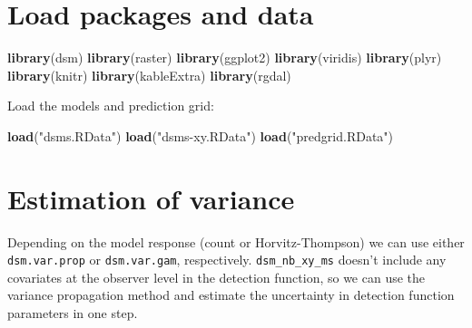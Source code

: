 \documentclass[]{book}
\newenvironment{Shaded}{\begin{snugshade}}{\end{snugshade}}
\newcommand{\KeywordTok}[1]{\textcolor[rgb]{0.13,0.29,0.53}{\textbf{#1}}}
\newcommand{\DataTypeTok}[1]{\textcolor[rgb]{0.13,0.29,0.53}{#1}}
\newcommand{\StringTok}[1]{\textcolor[rgb]{0.31,0.60,0.02}{#1}}
\newcommand{\CommentTok}[1]{\textcolor[rgb]{0.56,0.35,0.01}{\textit{#1}}}
\newcommand{\OperatorTok}[1]{\textcolor[rgb]{0.81,0.36,0.00}{\textbf{#1}}}
\newcommand{\NormalTok}[1]{#1}
\theoremstyle{definition}
\theoremstyle{definition}
\theoremstyle{remark}
\begin{document}
\section{Load packages and data}\label{load-packages-and-data}

\begin{Shaded}
\begin{Highlighting}[]
\KeywordTok{library}\NormalTok{(dsm)}
\KeywordTok{library}\NormalTok{(raster)}
\KeywordTok{library}\NormalTok{(ggplot2)}
\KeywordTok{library}\NormalTok{(viridis)}
\KeywordTok{library}\NormalTok{(plyr)}
\KeywordTok{library}\NormalTok{(knitr)}
\KeywordTok{library}\NormalTok{(kableExtra)}
\KeywordTok{library}\NormalTok{(rgdal)}
\end{Highlighting}
\end{Shaded}

Load the models and prediction grid:

\begin{Shaded}
\begin{Highlighting}[]
\KeywordTok{load}\NormalTok{(}\StringTok{"dsms.RData"}\NormalTok{)}
\KeywordTok{load}\NormalTok{(}\StringTok{"dsms-xy.RData"}\NormalTok{)}
\KeywordTok{load}\NormalTok{(}\StringTok{"predgrid.RData"}\NormalTok{)}
\end{Highlighting}
\end{Shaded}

\section{Estimation of variance}\label{estimation-of-variance}

Depending on the model response (count or Horvitz-Thompson) we can use
either \texttt{dsm.var.prop} or \texttt{dsm.var.gam}, respectively.
\texttt{dsm\_nb\_xy\_ms} doesn't include any covariates at the observer
level in the detection function, so we can use the variance propagation
method and estimate the uncertainty in detection function parameters in
one step.

\begin{Shaded}
\end{Shaded}
\end{document}
